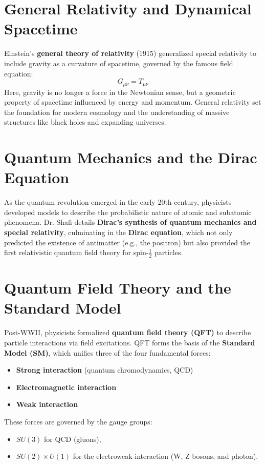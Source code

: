 \documentclass[12pt]{article}
\begin{document}
\section*{General Relativity and Dynamical Spacetime}
Einstein’s \textbf{general theory of relativity} (1915) generalized special relativity to include gravity as a curvature of spacetime, governed by the famous field equation:
\[
G_{\mu\nu} = T_{\mu\nu}
\]
Here, gravity is no longer a force in the Newtonian sense, but a geometric property of spacetime influenced by energy and momentum. General relativity set the foundation for modern cosmology and the understanding of massive structures like black holes and expanding universes.

\section*{Quantum Mechanics and the Dirac Equation}
As the quantum revolution emerged in the early 20th century, physicists developed models to describe the probabilistic nature of atomic and subatomic phenomena. Dr. Shafi details \textbf{Dirac’s synthesis of quantum mechanics and special relativity}, culminating in the \textbf{Dirac equation}, which not only predicted the existence of antimatter (e.g., the positron) but also provided the first relativistic quantum field theory for spin-$\frac{1}{2}$ particles.

\section*{Quantum Field Theory and the Standard Model}
Post-WWII, physicists formalized \textbf{quantum field theory (QFT)} to describe particle interactions via field excitations. QFT forms the basis of the \textbf{Standard Model (SM)}, which unifies three of the four fundamental forces:
\begin{itemize}
    \item \textbf{Strong interaction} (quantum chromodynamics, QCD)
    \item \textbf{Electromagnetic interaction}
    \item \textbf{Weak interaction}
\end{itemize}

These forces are governed by the gauge groups:
\begin{itemize}
    \item \( SU(3) \) for QCD (gluons),
    \item \( SU(2) \times U(1) \) for the electroweak interaction (W, Z bosons, and photon).
\end{itemize}
\end{document}

